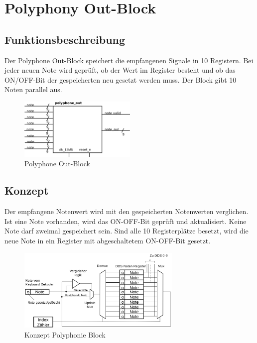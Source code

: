 \section{Polyphony Out-Block}\label{sect.polyphonie_umsetzung}
 
\subsection{Funktionsbeschreibung}

Der Polyphone Out-Block speichert die empfangenen Signale in 10 Registern. Bei jeder neuen Note wird geprüft, ob der Wert im Register besteht und ob das ON/OFF-Bit der gespeicherten neu gesetzt werden muss. Der Block gibt 10 Noten parallel aus.

\begin{figure}[H]
	\includegraphics[width=0.5\textwidth]{images/midi_interface/polyphonie_blockschaltbild.png}
	\caption{Polyphone Out-Block}
	\label{fig.polyphnie_out_block}
\end{figure}

\subsection{Konzept}\label{konzept_plyphonie}

Der empfangene Notenwert wird mit den gespeicherten Notenwerten verglichen. Ist eine Note vorhanden, wird das ON-OFF-Bit geprüft und aktualisiert. Keine Note darf zweimal gespeichert sein. Sind alle 10 Registerplätze besetzt, wird die neue Note in ein Register mit abgeschaltetem ON-OFF-Bit gesetzt.

\begin{figure}[H]
	\includegraphics[width=0.7\textwidth]{images/midi_interface/Konzept_Hans_polyphonie.png}
	\caption{Konzept Polyphonie Block \cite{konzept_poly} }
	\label{fig.polyphnie_konzept}
\end{figure}

